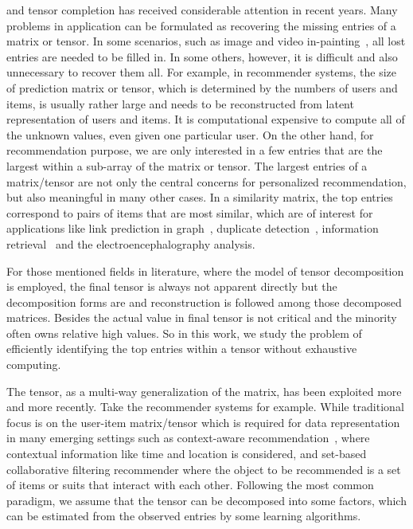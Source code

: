 \documentclass[10pt,journal,compsoc]{IEEEtran}
\begin{document}
 and tensor completion has received considerable attention in recent years.
Many problems in application can be formulated as recovering the missing entries of a matrix or tensor. In some scenarios, such as image and video in-painting~\cite{Ankita14},
all lost entries are needed to be filled in. In some others, however, it is difficult and also unnecessary to recover them all. For example, in recommender systems, the size of prediction matrix or tensor, which is determined by the numbers of users and items, is usually rather large and needs to be reconstructed from latent representation of users and items. It is computational expensive to compute all of the unknown values, even given one particular user. On the other hand, for recommendation purpose, we are only interested in a few entries that are the largest within a sub-array of the matrix or tensor.
The largest entries of a matrix/tensor are not only the central concerns for personalized recommendation, but also meaningful in many other cases. In a similarity matrix, the top entries correspond to pairs of items that are most similar, which are of interest for applications like link prediction in graph~\cite{LibenNowell07,DunlavyKolda11}, duplicate detection~\cite{Ke2010}, information retrieval~\cite{Salton03IR} and the electroencephalography analysis\cite{Estienne2001Multi}. 

For those mentioned fields in literature, where the model of tensor decomposition is employed, the final tensor is always not apparent directly but the decomposition forms are and reconstruction is followed among those decomposed matrices. Besides the actual value in final tensor is not critical and the minority often owns relative high values. So in this work, we study the problem of efficiently identifying the top entries within a tensor without exhaustive computing. 

The tensor, as a multi-way generalization of the matrix, has been exploited more and more recently. Take the recommender systems for example. While traditional focus is on the user-item matrix/tensor which is required for data representation in many emerging settings such as context-aware recommendation~\cite{BPTF,Adomavicius2011}, where contextual information like time and location is considered, and set-based collaborative filtering recommender\cite{HuYiLa15,Rendle_PITF,KoYe09} where the object to be recommended is a set of items or suits that interact with each other. Following the most common paradigm, we assume that the tensor can be decomposed into some factors, which can be estimated from the observed entries by some learning algorithms.
\end{document}
